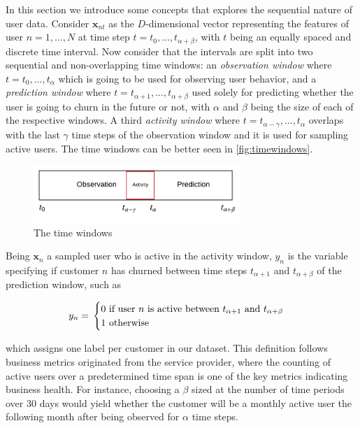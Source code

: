 \documentclass{kththesis}
\begin{document}
In this section we introduce some concepts that explores the sequential nature of user data. Consider $\mathbf{x}_{nt}$ as the $D$-dimensional vector representing the features of user $n=1,...,N$ at time step $t = t_0,...,t_{\alpha+\beta}$, with $t$ being an equally spaced and discrete time interval. Now consider that the intervals are split into two sequential and non-overlapping time windows: an \emph{observation window} where $t = t_0,...,t_\alpha$ which is going to be used for observing user behavior, and a \emph{prediction window} where $t = t_{\alpha+1},...,t_{\alpha+\beta}$ used solely for predicting whether the user is going to churn in the future or not, with $\alpha$ and $\beta$ being the size of each of the respective windows. A third \emph{activity window} where $t=t_{\alpha-\gamma},...,t_\alpha$ overlaps with the last $\gamma$ time steps of the observation window and it is used for sampling active users. The time windows can be better seen in \autoref{fig:timewindows}.

\begin{figure}[h]
    \centering
    \includegraphics[width=0.7\textwidth,keepaspectratio]{figures/timewindows.pdf}
    \caption{The time windows}
    \label{fig:timewindows}
\end{figure}

Being $\mathbf{x}_n$ a sampled user who is active in the activity window, $y_{n}$ is the variable specifying if customer $n$ has churned between time steps $t_{\alpha+1}$ and $t_{\alpha+\beta}$ of the prediction window, such as

\begin{equation}
y_n = \\ 
\begin{cases}
  \text{0 if user $n$ is active between $t_{\alpha+1}$ and $t_{\alpha+\beta}$} \\    
  \text{1 otherwise}    
\end{cases}
\end{equation}

which assigns one label per customer in our dataset. This definition follows business metrics originated from the service provider, where the counting of active users over a predetermined time span is one of the key metrics indicating business health. For instance, choosing a $\beta$ sized at the number of time periods over 30 days would yield whether the customer will be a monthly active user the following month after being observed for $\alpha$ time steps. 
\end{document}
